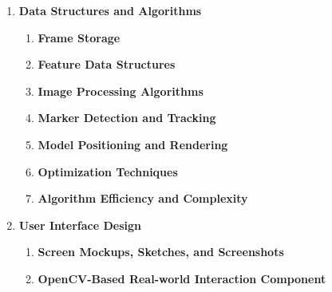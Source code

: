 \documentclass[12pt]{article}
\begin{document}
\begin{enumerate}
      \item \textbf{Data Structures and Algorithms}
            \begin{enumerate}
                  \item \textbf{Frame Storage}

                  \item \textbf{Feature Data Structures}

                  \item \textbf{Image Processing Algorithms}

                  \item \textbf{Marker Detection and Tracking}

                  \item \textbf{Model Positioning and Rendering}

                  \item \textbf{Optimization Techniques}

                  \item \textbf{Algorithm Efficiency and Complexity}
            \end{enumerate}


      \item \textbf{User Interface Design}
            \begin{enumerate}
                  \item \textbf{Screen Mockups, Sketches, and Screenshots}

                  \item \textbf{OpenCV-Based Real-world Interaction Component}


\end{enumerate}
\end{enumerate}
\end{document}
